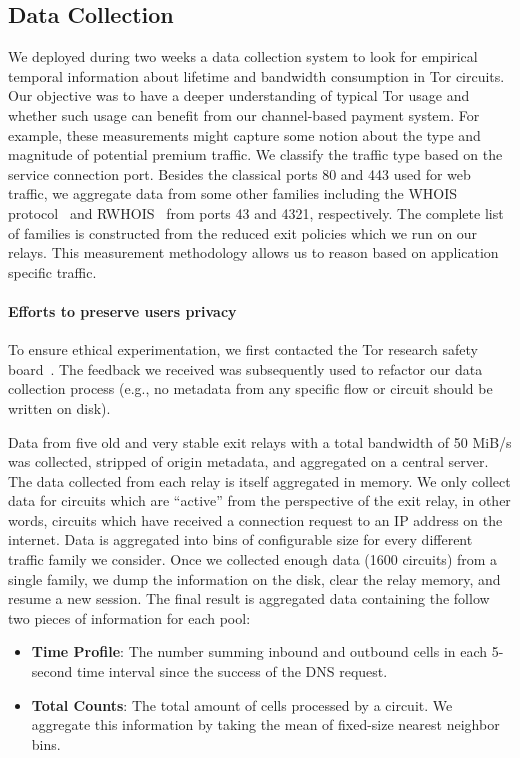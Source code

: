 \subsection{Data Collection}
\label{subsec:datacollection}

We deployed during two weeks a data collection system to look for empirical temporal information about lifetime and bandwidth consumption in Tor circuits.
Our objective was to have a deeper understanding of typical Tor usage and whether such usage can benefit from our channel-based payment system.
For example, these measurements might capture some notion about the type and magnitude of potential premium traffic.
We classify the traffic type based on the service connection port.
Besides the classical ports 80 and 443 used for web traffic, we aggregate data from some other families including the WHOIS protocol~\cite{daigle2004whois} and RWHOIS~\cite{williamson1994referral} from ports 43 and 4321, respectively.
The complete list of families is constructed from the reduced exit policies which we run on our relays.
This measurement methodology allows us to reason based on application specific traffic.

\paragraph*{Efforts to preserve users privacy}

To ensure ethical experimentation, we first contacted the Tor research safety board~\cite{torsafety}.
The feedback we received was subsequently used to refactor our data collection process (e.g., no metadata from any specific flow or circuit should be written on disk).

Data from five old and very stable exit relays with a total bandwidth of 50 MiB/s was collected, stripped of origin metadata, and aggregated on a central server.
The data collected from each relay is itself aggregated in memory.
We only collect data for circuits which are ``active'' from the perspective of the exit relay, in other words, circuits which have received a connection request to an IP address on the internet.
Data is aggregated into bins of configurable size for every different traffic family we consider.
Once we collected enough data (1600 circuits) from a single family, we dump the information on the disk, clear the relay memory, and resume a new session.
The final result is aggregated data containing the follow two pieces of information for each pool:

\begin{itemize}
\item \textbf{Time Profile}: The number summing inbound and outbound cells in each 5-second time interval since the success of the DNS request.
\item \textbf{Total Counts}: The total amount of cells processed by a circuit.
  We aggregate this information by taking the mean of fixed-size nearest neighbor bins.
\end{itemize}

